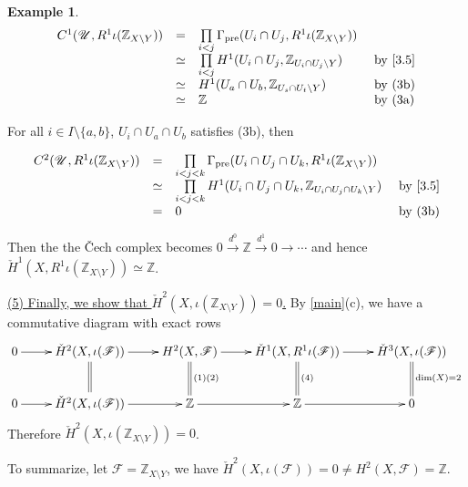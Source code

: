 \documentclass{amsart}
\numberwithin{equation}{section}
\theoremstyle{plain}
\theoremstyle{definition}
\newtheorem{eg}[equation]{Example}
\DeclareMathOperator{\Pre}{pre}
\begin{document}
\begin{eg}
	$$ 
	\begin{array}{llll}
	C^1(\mathscr U, R^1\iota(\mathbb Z_{X\setminus Y}))&=&\prod\limits_{i<j}\Gamma_{\Pre}(U_i\cap U_j, R^1\iota(\mathbb Z_{X\setminus Y}))&\\
	&\simeq& \prod\limits_{i<j}H^1(U_i\cap U_j, \mathbb Z_{U_i\cap U_j\setminus Y}) &\text{ by \cref{3.5}}\\
	&\simeq& H^1(U_a\cap U_b, \mathbb Z_{U_s\cap U_t\setminus Y})&\text{ by (3b)}\\
	&\simeq& \mathbb Z&\text{ by (3a)}\\
	\end{array}
	$$
	
	For all $ i\in I\setminus\{a,b\} $, $ U_i\cap U_a\cap U_b$ satisfies (3b), then
	
	$$ 
	\begin{array}{llll}
	C^2(\mathscr U, R^1\iota(\mathbb Z_{X\setminus Y}))&=&\prod\limits_{i<j<k}\Gamma_{\Pre}(U_i\cap U_j\cap U_k, R^1\iota(\mathbb Z_{X\setminus Y}))&\\
	&\simeq& \prod\limits_{i<j<k}H^1(U_i\cap U_j\cap U_k, \mathbb Z_{U_i\cap U_j\cap U_k\setminus Y}) &\text{ by \cref{3.5}}\\
	&=&0&\text{ by (3b)}\\
	\end{array}
	$$
	
	Then the the \v{C}ech complex becomes
	$0\xrightarrow{d^0} \mathbb Z\xrightarrow{d^1} 0\to\cdots$ and hence $ \check{H}^1(X, R^1\iota(\mathbb Z_{X\setminus Y}))\simeq \mathbb Z $. 
	
	\underline{(5) Finally, we show that $ \check{H}^2(X, \iota(\mathbb Z_{X\setminus Y}))=0 $.} 
By \cref{main}(c), we have a commutative diagram with exact rows $$
\xymatrix{
0\ar[r]&\check{H}^2(X,\iota(\mathscr F))\ar[r]\ar@{=}[d]&H^2(X, \mathscr F)\ar[r]\ar@{=}[d]^{\text{(1)(2)}} &\check{H}^1(X, R^1\iota(\mathscr F))\ar[r]\ar@{=}[d]^{\text{(4)}}&\check{H}^3(X, \iota(\mathscr F))\ar@{=}[d]^{\dim(X)=2}\\
0\ar[r]& \check{H}^2(X,\iota(\mathscr F))\ar[r] &\mathbb Z\ar[r]&\mathbb Z\ar[r]&0\\
}
$$
Therefore $ \check{H}^2(X, \iota(\mathbb Z_{X\setminus Y}))=0 $. 

To summarize, let $ \mathscr F= \mathbb Z_{X\setminus Y}$, we have $ \check H^2(X, \iota(\mathscr F))=0\ne H^2(X, \mathscr F)=\mathbb Z  $.
\end{eg}
\end{document}
